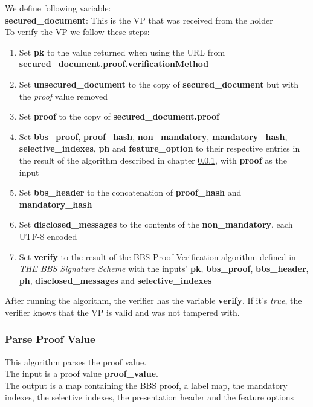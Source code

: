 \documentclass[
	a4paper               %
	,BCOR=0mm            %
	,bibliography=totoc   %
	,listof=totoc         %
	,monolingual
	,twoside=false
]{bfhthesis}              %
\begin{document}
We define following variable:\\
\textbf{secured\_document}: This is the VP that was received from the holder\\

To verify the VP we follow these steps:
\begin{enumerate}
	\item Set \textbf{pk} to the value returned when using the URL from \textbf{secured\_document.proof.verificationMethod}
	\item Set \textbf{unsecured\_document} to the copy of \textbf{secured\_document} but with the \textit{proof} value removed
	\item Set \textbf{proof} to the copy of \textbf{secured\_document.proof}
	\item Set \textbf{bbs\_proof}, \textbf{proof\_hash}, \textbf{non\_mandatory}, \textbf{mandatory\_hash}, \textbf{selective\_indexes}, \textbf{ph} and \textbf{feature\_option} to their respective entries in the result of the algorithm described in chapter \ref{subsub:parseproof}, with \textbf{proof} as the input
	\item Set \textbf{bbs\_header} to the concatenation of \textbf{proof\_hash} and \textbf{mandatory\_hash}
	\item Set \textbf{disclosed\_messages} to the contents of the \textbf{non\_mandatory}, each UTF-8 encoded
	\item Set \textbf{verify} to the result of the BBS Proof Verification algorithm defined in \textit{THE BBS Signature Scheme}\cite{bbs-signature-scheme} with the inputs' \textbf{pk}, \textbf{bbs\_proof}, \textbf{bbs\_header}, \textbf{ph}, \textbf{disclosed\_messages} and \textbf{selective\_indexes}
\end{enumerate}

After running the algorithm, the verifier has the variable \textbf{verify}. If it's \textit{true}, the verifier knows that the VP is valid and was not tampered with.

\subsubsection{Parse Proof Value}
\label{subsub:parseproof}
This algorithm parses the proof value.\\

The input is a proof value \textbf{proof\_value}.\\

The output is a map containing the BBS proof, a label map, the mandatory indexes, the selective indexes, the presentation header and the feature options\\
\end{document}

